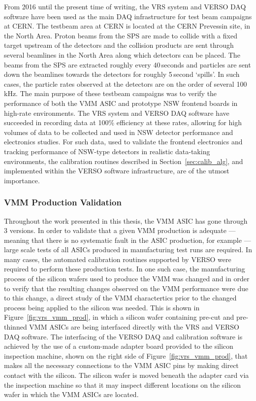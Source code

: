 From 2016 until the present time of writing, the VRS system and VERSO DAQ software have been used as the main DAQ infrastructure
for test beam campaigns at CERN.
The testbeam area at CERN is located at the CERN Prevessin site, in the North Area.
Proton beams from the SPS are made to collide with a fixed target upstream of the detectors and
the collision products are sent through several beamlines in the North Area along which
detectors can be placed.
The beams from the SPS are extracted roughly every 40\,seconds and particles are sent down the beamlines towards
the detectors for roughly 5\,second `spills'.
In such cases, the particle rates observed at the detectors are on the order of several 100\,kHz.
The main purpose of these testbeam campaigns was to verify the performance of both the VMM ASIC and prototype NSW frontend
boards in high-rate environments.
The VRS system and VERSO DAQ software have succeeded in recording data at 100\% efficiency at these
rates, allowing for high volumes of data to be collected and used in NSW detector performance and electronics studies.
For such data, used to validate the frontend electronics and tracking performance of NSW-type detectors in realistic data-taking environments,
the calibration routines described in Section~\ref{sec:calib_alg}, and implemented within the VERSO software infrastructure, are of the utmost importance.

\subsubsection{VMM Production Validation}
\label{sec:verso_vmm_prod}

Throughout the work presented in this thesis, the VMM ASIC has gone through 3 versions.
In order to validate that a given VMM production is adequate --- meaning that there is no systematic
fault in the ASIC production, for example --- large scale tests of all ASICs produced in manufacturing test runs 
are required.
In many cases, the automated calibration routines supported by VERSO were required to perform these production
tests.
In one such case, the manufacturing process of the silicon wafers used to produce the VMM was changed
and in order to verify that the resulting changes observed on the VMM performance were due to this
change, a direct study of the VMM charactertics prior to the changed process being applied
to the silicon was needed.
This is shown in Figure~\ref{fig:vrs_vmm_prod}, in which a silicon wafer containing pre-cut and pre-thinned
VMM ASICs are being interfaced directly with the VRS and VERSO DAQ software.
The interfacing of the VERSO DAQ and calibration software is achieved by the use of a custom-made
adapter board provided to the silicon inspection machine, shown on the right side of Figure~\ref{fig:vrs_vmm_prod}, that makes all the necessary
connections to the VMM ASIC pins by making direct contact with the silicon.
The silicon wafer is moved beneath the adapter card via the inspection machine
so that it may inspect different locations on the silicon wafer in which the VMM ASICs are located.


